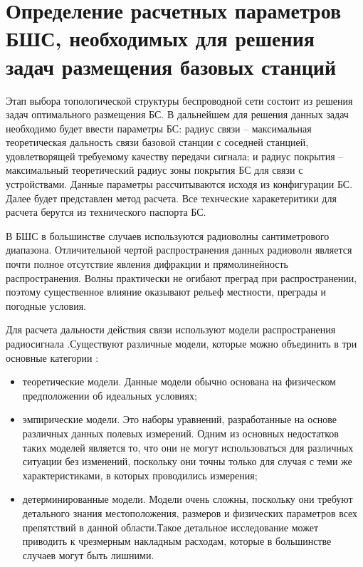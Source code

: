 \section{Определение расчетных параметров БШС, необходимых для решения задач размещения базовых станций}

Этап выбора топологической структуры беспроводной сети состоит из решения задач оптимального размещения БС. В дальнейшем для решения данных задач необходимо будет ввести параметры БС: радиус связи -- максимальная теоретическая дальность связи базовой станции с соседней станцией, удовлетворящей требуемому качеству передачи сигнала; и радиус покрытия -- максимальный теоретический радиус зоны покрытия БС для связи с устройствами. Данные параметры рассчитываются исходя из конфигурации БС. Далее будет представлен метод расчета. Все технческие харакетеритики для расчета берутся из технического паспорта БС.




В БШС в большинстве случаев используются радиоволны сантиметрового диапазона. Отличительной чертой распространения данных радиоволн  является почти полное отсутствие явления дифракции и прямолинейность распространения. Волны практически не огибают преград при распространении, поэтому существенное влияние оказывают рельеф местности, преграды и погодные условия. 

Для расчета дальности действия связи используют модели распространения радиосигнала \cite{ElChall2019, Zhang2021, Caso2015, Kang2020}.Существуют различные модели, которые можно объединить в три основные категории \cite{Oni2017}:
  \begin{itemize}
    \item теоретические модели. Данные модели обычно основана на физическом предположении об идеальных условиях;
    \item эмпирические модели. Это наборы уравнений, разработанные на основе различных данных полевых измерений. Одним из основных недостатков таких моделей является то, что они не могут использоваться для различных ситуации без изменений, поскольку они точны только для случая с теми же характеристиками, в которых проводились измерения;
    \item детерминированные модели. Модели очень сложны, поскольку они требуют детального знания местоположения, размеров и физических параметров всех препятствий в данной области.Такое детальное исследование может приводить к чрезмерным накладным расходам, которые в большинстве случаев могут быть лишними.
  \end{itemize}

